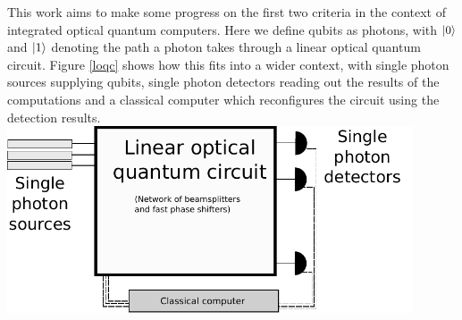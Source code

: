 This work aims to make some progress on the first two criteria in the context of integrated optical quantum computers. Here we define qubits as photons, with $\ket{0}$ and $\ket{1}$ denoting the path a photon takes through a linear optical quantum circuit. Figure \ref{loqc} shows how this fits into a wider context, with single photon sources supplying qubits, single photon detectors reading out the results of the computations and a classical computer which reconfigures the circuit using the detection results.
\newpage
\begingroup
    \centering  
    \includegraphics[width=12cm]{img/theory/loqc.pdf}
     \vspace{3pt} \label{loqc}
\endgroup




